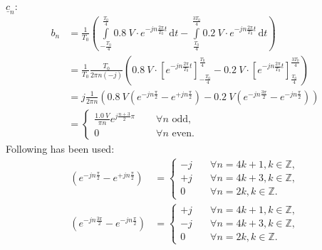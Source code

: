 \begin{solution}
\begin{tasks}
		\task
		$\underline{c}_n$:
		\begin{equation*}
			\begin{split}
				b_n &= \frac{1}{T_0} \left( \int\limits_{-\frac{T_0}{4}}^{\frac{T_0}{4}} \SI{0.8}{V} \cdot e^{-j n\frac{2\pi}{T_0}t} \, \mathrm{d} t - \int\limits_{\frac{T_0}{4}}^{\frac{3T_0}{4}} \SI{0.2}{V} \cdot e^{-j n\frac{2\pi}{T_0}t} \, \mathrm{d} t \right) \\
				&= \frac{1}{T_0} \frac{T_0}{2 \pi n (-j)} \left(
					\SI{0.8}{V} \cdot \left[e^{-j n\frac{2\pi}{T_0}t}\right]_{-\frac{T_0}{4}}^{\frac{T_0}{4}}
					- \SI{0.2}{V} \cdot \left[e^{-j n\frac{2\pi}{T_0}t}\right]_{\frac{T_0}{4}}^{\frac{3T_0}{4}}
				\right) \\
				&= j \frac{1}{2 \pi n} \left(
					\SI{0.8}{V} \left(
						e^{-j n\frac{\pi}{2}}
						- e^{+j n\frac{\pi}{2}}
					\right)
					- \SI{0.2}{V} \left(
						e^{-j n\frac{3 \pi}{2}}
						- e^{-j n\frac{\pi}{2}}
					\right)
				\right) \\
				&=  \begin{cases}
					\frac{\SI{1,0}{V}}{\pi n} e^{j\frac{n+3}{2}\pi} &\quad \; \forall n \text{ odd}, \\
					0 &\quad \; \forall n \text{ even}.
				\end{cases}
			\end{split}
		\end{equation*}
		Following has been used:
		\begin{equation*}
			\begin{split}
				\left(e^{-j n\frac{\pi}{2}} - e^{+j n\frac{\pi}{2}}\right) &= \begin{cases}
					-j &\quad \forall n = 4 k + 1, k \in \mathbb{Z}, \\
					+j &\quad \forall n = 4 k + 3, k \in \mathbb{Z}, \\
					0 &\quad \forall n = 2 k, k \in \mathbb{Z}.
				\end{cases} \\
				\left(e^{-j n\frac{3 \pi}{2}} - e^{-j n\frac{\pi}{2}}\right) &= \begin{cases}
					+j &\quad \forall n = 4 k + 1, k \in \mathbb{Z}, \\
					-j &\quad \forall n = 4 k + 3, k \in \mathbb{Z}, \\
					0 &\quad \forall n = 2 k, k \in \mathbb{Z}.
				\end{cases}
			\end{split}
		\end{equation*}
		

\end{tasks}
\end{solution}

